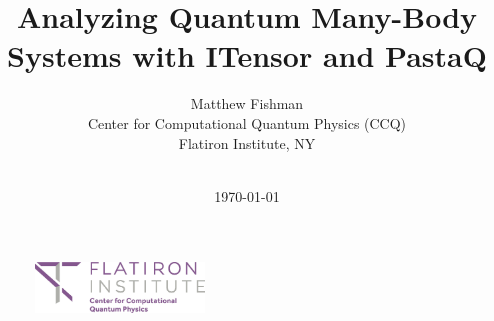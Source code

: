 \documentclass{beamer}
\title{
  \centering
  Analyzing Quantum Many-Body Systems with ITensor and PastaQ
}
\author{
  \centering
  Matthew Fishman \\
  Center for Computational Quantum Physics (CCQ) \\
  Flatiron Institute, NY \\
  \myhref{https://mtfishman.github.io/}{mtfishman.github.io} \\
  \myhref{https://github.com/mtfishman/ITensorTutorials.jl/}{github.com/mtfishman/ITensorTutorials.jl}
}
\date{\today}
\begin{document}
\begin{frame}

  \begin{center}

    \maketitle

  \end{center}

  \begin{figure}[T]

      \centering
      \includegraphics[width=0.4\textwidth]{
        slides/assets/who-am-i-flatiron-institute-ccq.jpg
      }

  \end{figure}

\end{frame}













































\end{document}
